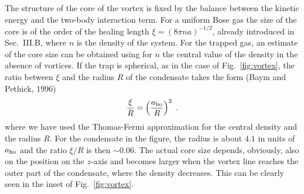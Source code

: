 The structure of the core of the vortex is fixed
by the balance between the kinetic energy  and  the two-body interaction
term. For a uniform  Bose gas the size of the core is of the order of
the healing length $\xi =  (8\pi n a)^{-1/2}$, already introduced in
Sec.~III.B, where $n$ is the density of the system. For the trapped gas,
an  estimate of the core size can be obtained using for $n$ the central
value of the density in the absence of vortices. If the trap is spherical,
as in the case of  Fig.~\ref{fig:vortex}, the ratio between $\xi$ and
the radius $R$ of the condensate takes the form (Baym and Pethick, 1996)
\begin{equation}
\frac{\xi}{R} = \left(\frac{a_{\rm ho}}{R}\right)^2 \; .
\label{eq:vorhl1}
\end{equation}
where we have used the Thomas-Fermi approximation for the central density
and the radius $R$. For the condensate in the figure, the radius is
about $4.1$ in units of $a_{\rm ho}$ and the ratio $\xi/R$ is then
$\sim 0.06$. The actual core size depends, obviously, also on the
position on the $z$-axis and becomes larger when the vortex
line reaches the outer part of the condensate, where the density 
decreases. This can be clearly seen in the inset of Fig.~\ref{fig:vortex}. 

